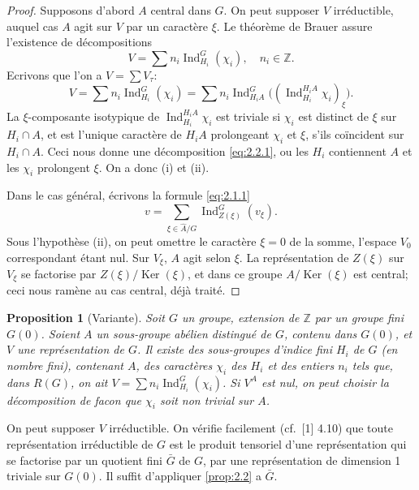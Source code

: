 \documentclass[12pt,a4paper]{article}
\theoremstyle{plain}
\newtheorem{proposition}[theorem]{Proposition}
\theoremstyle{definition}
\theoremstyle{remark}
\DeclareMathOperator{\Ind}{Ind}
\newcommand{\bZ}{\mathbb{Z}}
\providecommand{\Ker}{\operatorname{Ker}}
\begin{document}
\begin{proof}
Supposons d'abord $A$ central dans $G$. On peut supposer $V$ irr\'eductible, auquel cas $A$ agit sur $V$ par un caract\`ere $\xi$. Le th\'eor\`eme de Brauer assure l'existence de d\'ecompositions
\begin{equation}\label{eq:2.2.1}
V = \sum n_i \Ind_{H_i}^G(\chi_i), \quad n_i \in \bZ.
\end{equation}
Ecrivons que l'on a $V = \sum V_\tau$:
\[
V = \sum n_i \Ind_{H_i}^G(\chi_i) = \sum n_i \Ind_{H_i A}^G\bigl((\Ind_{H_i}^{H_i A} \chi_i)_\xi\bigr).
\]
La $\xi$-composante isotypique de $\Ind_{H_i}^{H_i A} \chi_i$ est triviale si $\chi_i$ est distinct de $\xi$ sur $H_i \cap A$, et est l'unique caract\`ere de $H_i A$ prolongeant $\chi_i$ et $\xi$, s'ils co\"incident sur $H_i \cap A$. Ceci nous donne une d\'ecomposition \eqref{eq:2.2.1}, ou les $H_i$ contiennent $A$ et les $\chi_i$ prolongent $\xi$. On a donc (i) et (ii).

Dans le cas g\'en\'eral, \'ecrivons la formule \eqref{eq:2.1.1}
\[
v = \sum_{\xi \in \hat{A}/G} \Ind_{Z(\xi)}^G(v_\xi).
\]
Sous l'hypoth\`ese (ii), on peut omettre le caract\`ere $\xi = 0$ de la somme, l'espace $V_0$ correspondant \'etant nul. Sur $V_\xi$, $A$ agit selon $\xi$. La repr\'esentation de $Z(\xi)$ sur $V_\xi$ se factorise par $Z(\xi)/\Ker(\xi)$, et dans ce groupe $A/\Ker(\xi)$ est central; ceci nous ram\`ene au cas central, d\'ej\`a trait\'e.
\end{proof}

\begin{proposition}[Variante]\label{prop:2.3}
Soit $G$ un groupe, extension de $\bZ$ par un groupe fini $G(0)$. Soient $A$ un sous-groupe ab\'elien distingu\'e de $G$, contenu dans $G(0)$, et $V$ une repr\'esentation de $G$. Il existe des sous-groupes d'indice fini $H_i$ de $G$ (en nombre fini), contenant $A$, des caract\`eres $\chi_i$ des $H_i$ et des entiers $n_i$ tels que, dans $R(G)$, on ait $V = \sum n_i \Ind_{H_i}^G(\chi_i)$. Si $V^A$ est nul, on peut choisir la d\'ecomposition de facon que $\chi_i$ soit non trivial sur $A$.
\end{proposition}

On peut supposer $V$ irr\'eductible. On v\'erifie facilement (cf.~[1] 4.10) que toute repr\'esentation irr\'eductible de $G$ est le produit tensoriel d'une repr\'esentation qui se factorise par un quotient fini $\bar{G}$ de $G$, par une repr\'esentation de dimension 1 triviale sur $G(0)$. Il suffit d'appliquer \ref{prop:2.2} a $\bar{G}$.
\end{document}
